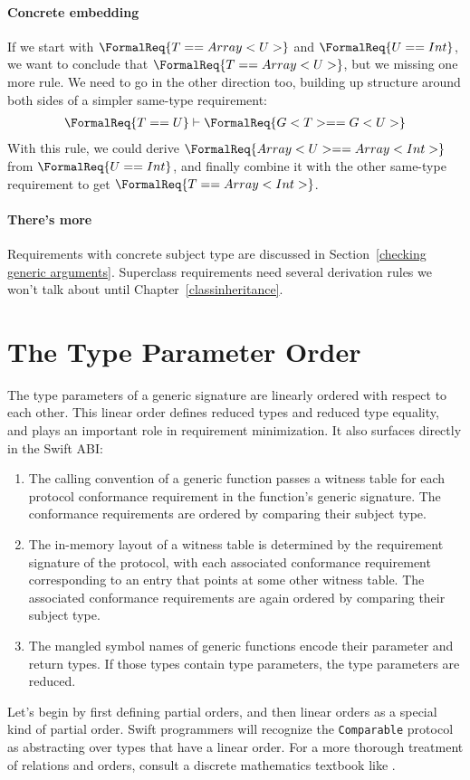 \documentclass[../generics]{subfiles}
\begin{document}
\paragraph{Concrete embedding}
If we start with $\FormalReq{T == Array<U>}$ and $\FormalReq{U == Int}$, we want to conclude that $\FormalReq{T == Array<U>}$, but we missing one more rule. We need to go in the other direction too, building up structure around both sides of a simpler same-type requirement:
\begin{gather*}
\FormalReq{T == U}\vdash\FormalReq{G<T> == G<U>}
\end{gather*}
With this rule, we could derive $\FormalReq{Array<U> == Array<Int>}$ from $\FormalReq{U == Int}$, and finally combine it with the other same-type requirement to get $\FormalReq{T == Array<Int>}$.

\paragraph{There's more}
Requirements with concrete subject type are discussed in Section~\ref{checking generic arguments}. Superclass requirements need several derivation rules we won't talk about until Chapter~\ref{classinheritance}.

\section{The Type Parameter Order}\label{typeparams}

%
%
%
%
%
%
The type parameters of a generic signature are linearly ordered with respect to each other. This linear order defines reduced types and reduced type equality, and plays an important role in requirement minimization. It also surfaces directly in the Swift ABI:
\begin{enumerate}
\item The calling convention of a generic function passes a witness table for each protocol conformance requirement in the function's generic signature. The conformance requirements are ordered by comparing their subject type.
\item The in-memory layout of a witness table is determined by the requirement signature of the protocol, with each associated conformance requirement corresponding to an entry that points at some other witness table. The associated conformance requirements are again ordered by comparing their subject type.
\item The mangled symbol names of generic functions encode their parameter and return types. If those types contain type parameters, the type parameters are reduced.
\end{enumerate}
Let's begin by first defining partial orders, and then linear orders as a special kind of partial order. Swift programmers will recognize the \texttt{Comparable} protocol as abstracting over types that have a linear order. For a more thorough treatment of relations and orders, consult a discrete mathematics textbook like \cite{grimaldi}.
\end{document}
